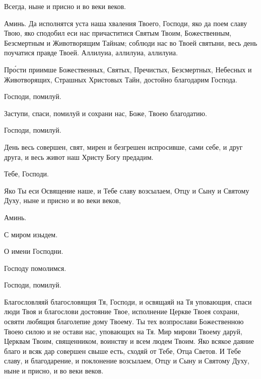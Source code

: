 \begin{mymulticols}

 Всегда, ныне и присно и во веки веков.

 Аминь. Да исполнятся уста наша хваления Твоего, Господи, яко да поем славу Твою, яко сподобил еси нас причаститися Святым Твоим, Божественным, Безсмертным и Животворящим Тайнам; соблюди нас во Твоей святыни, весь день поучатися правде Твоей. Аллилуиа, аллилуиа, аллилуиа. 



 Пр\'{о}сти приимше Божественных, Святых, Пречистых, Безсмертных, Небесных и Животворящих, Страшных Христовых Тайн, достойно благодарим Господа. 

 Господи, помилуй. 

 Заступи, спаси, помилуй и сохрани нас, Боже, Твоею благодатию. 

 Господи, помилуй. 

 День весь совершен, свят, мирен и безгрешен испросивше, сами себе, и друг друга, и весь живот наш Христу Богу предадим. 

 Тебе, Господи. 

 Яко Ты еси Освящение наше, и Тебе славу возсылаем, Отцу и Сыну и Святому Духу, ныне и присно и во веки веков,

 Аминь.

 С миром изыдем.

 О имени Господни. 

 Господу помолимся.

 Господи, помилуй. 


 Благословляяй благословящия Тя, Господи, и освящаяй на Тя уповающия, спаси люди Твоя и благослови достояние Твое, исполнение Церкве Твоея сохрани, освяти любящия благолепие дому Твоему. Ты тех возпрослави Божественною Твоею силою и не остави нас, уповающих на Тя. Мир мирови Твоему даруй, Церквам Твоим, священником, воинству и всем людем Твоим. Яко всякое даяние благо и всяк дар совершен свыше есть, сходяй от Тебе, Отца Светов. И Тебе славу, и благодарение, и поклонение возсылаем, Отцу и Сыну и Святому Духу, ныне и присно, и во веки веков. 


\end{mymulticols}
